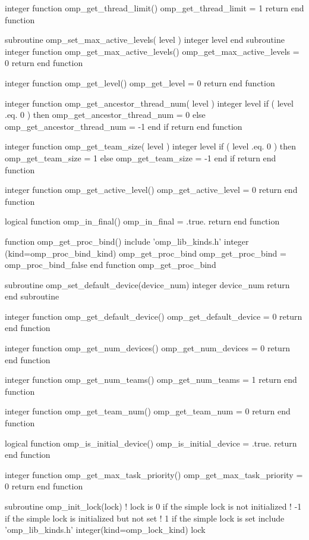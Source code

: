 {\begin{codepar}
integer function omp\_get\_thread\_limit()
  omp\_get\_thread\_limit = 1
  return
end function

subroutine omp\_set\_max\_active\_levels( level )
  integer level
  end subroutine
  integer function omp\_get\_max\_active\_levels()
  omp\_get\_max\_active\_levels = 0
  return
end function

integer function omp\_get\_level()
  omp\_get\_level = 0
  return
end function

integer function omp\_get\_ancestor\_thread\_num( level )
  integer level
  if ( level .eq. 0 ) then
     omp\_get\_ancestor\_thread\_num = 0
  else
     omp\_get\_ancestor\_thread\_num = -1
  end if
  return
end function

integer function omp\_get\_team\_size( level )
  integer level
  if ( level .eq. 0 ) then
     omp\_get\_team\_size = 1
  else
     omp\_get\_team\_size = -1
  end if
  return
end function

integer function omp\_get\_active\_level()
  omp\_get\_active\_level = 0
  return
end function

logical function omp\_in\_final()
  omp\_in\_final = .true.
  return
end function

function omp\_get\_proc\_bind()
  include 'omp\_lib\_kinds.h'
  integer (kind=omp\_proc\_bind\_kind) omp\_get\_proc\_bind
  omp\_get\_proc\_bind = omp\_proc\_bind\_false
end function omp\_get\_proc\_bind

subroutine omp\_set\_default\_device(device\_num)
  integer device\_num
  return
end subroutine

integer function omp\_get\_default\_device()
  omp\_get\_default\_device = 0
  return
end function

integer function omp\_get\_num\_devices()
  omp\_get\_num\_devices = 0
  return
end function

integer function omp\_get\_num\_teams()
  omp\_get\_num\_teams = 1
  return
end function

integer function omp\_get\_team\_num()
  omp\_get\_team\_num = 0
  return
end function

logical function omp\_is\_initial\_device()
  omp\_is\_initial\_device = .true.
  return
end function

integer function omp\_get\_max\_task\_priority()
  omp\_get\_max\_task\_priority = 0
  return
end function

subroutine omp\_init\_lock(lock)
  ! lock is 0 if the simple lock is not initialized
  !        -1 if the simple lock is initialized but not set
  !         1 if the simple lock is set
  include 'omp\_lib\_kinds.h'
  integer(kind=omp\_lock\_kind) lock


\end{codepar}}

